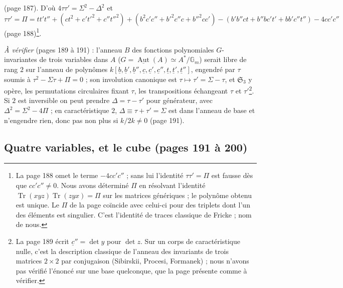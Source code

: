 \documentclass[11pt,a4paper]{article}
\begin{document}
(page 187). D'où $4\tau\tau' = \Sigma^2 - \Delta^2$ et
\[
  \tau\tau' = \Pi = tt't'' + (ct^2 + c't'^2 + c''t''^2) + (b^2c'c'' + b'^2c''c +
  b''^2cc') - (b'b''ct + b''bc't' + bb'c''t'') - 4cc'c''
\]
(page 188)\footnote{La page 188 omet le terme $-4cc'c''$ ; sans lui l'identité
$\tau\tau' = \Pi$ est fausse dès que $cc'c'' \neq 0$. Nous avons déterminé
$\Pi$ en résolvant l'identité $\operatorname{Tr}(xyz)\operatorname{Tr}(zyx) =
\Pi$ sur les matrices génériques ; le polynôme obtenu est unique. Le $\Pi$ de
la page coïncide avec celui-ci pour des triplets dont l'un des éléments est
singulier. C'est l'identité de traces classique de Fricke ; nom de nous.}.

\emph{À vérifier} (pages 189 à 191) : l'anneau $B$ des fonctions polynomiales
$G$-invariantes de trois variables dans $A$ ($G = \underline{\operatorname{Aut}}(A)
\simeq A^{*}/\mathbb{G}_m$) serait libre de rang $2$ sur l'anneau de polynômes
$k[\underline{b}, \underline{b}', \underline{b}'', \underline{c}, \underline{c}',
\underline{c}'', \underline{t}, \underline{t}', \underline{t}'']$, engendré par
$\tau$ soumis à $\tau^2 - \Sigma\tau + \Pi = 0$ ; son involution canonique est
$\tau \mapsto \tau' = \Sigma - \tau$, et $\mathfrak{S}_3$ y opère, les
permutations circulaires fixant $\tau$, les transpositions échangeant $\tau$ et
$\tau'$\footnote{La page 189 écrit $\underline{c}'' = \det y$ pour $\det z$.
Sur un corps de caractéristique nulle, c'est la description classique de
l'anneau des invariants de trois matrices $2 \times 2$ par conjugaison (Sibirskii,
Procesi, Formanek) ; nous n'avons pas vérifié l'énoncé sur une base
quelconque, que la page présente comme à vérifier.}. Si $2$ est inversible on
peut prendre $\Delta = \tau - \tau'$ pour générateur, avec $\Delta^2 = \Sigma^2 -
4\Pi$ ; en caractéristique $2$, $\Delta \equiv \tau + \tau' = \Sigma$ est dans
l'anneau de base et n'engendre rien, donc pas non plus si $k/2k \neq 0$ (page
191).

\subsection*{Quatre variables, et le cube (pages 191 à 200)}
\end{document}
